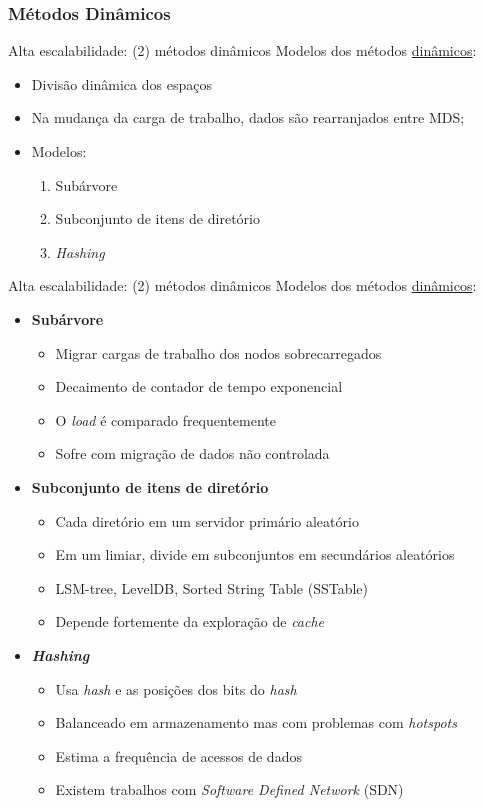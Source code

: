 \documentclass[xcolor=dvipsnames,table]{beamer}
\begin{document}
\subsubsection{Métodos Dinâmicos}
\begin{frame}{Alta escalabilidade: (2) métodos dinâmicos}
	Modelos dos métodos \underline{dinâmicos}:
	\begin{itemize}
		\item Divisão dinâmica dos espaços
		\item Na mudança da carga de trabalho, dados são rearranjados entre MDS;
		\item Modelos:
		\begin{enumerate}
			\item Subárvore
			\item Subconjunto de itens de diretório
			\item \textit{Hashing}
		\end{enumerate}
	\end{itemize}	
\end{frame}

\begin{frame}{Alta escalabilidade: (2) métodos dinâmicos}
	Modelos dos métodos \underline{dinâmicos}:
	\begin{itemize}
		\item \textbf{Subárvore}
		\begin{itemize}
			\item Migrar cargas de trabalho dos nodos sobrecarregados
			\item Decaimento de contador de tempo exponencial
			\item O \textit{load} é comparado frequentemente
			\item Sofre com migração de dados não controlada
		\end{itemize}
		\item \textbf{Subconjunto de itens de diretório}
		\begin{itemize}
			\item Cada diretório em um servidor primário aleatório
			\item Em um limiar, divide em subconjuntos em secundários aleatórios
			\item LSM-tree, LevelDB, Sorted String Table (SSTable)
			\item Depende fortemente da exploração de \textit{cache}
		\end{itemize}
		\item \textbf{\textit{Hashing}}
		\begin{itemize}
			\item Usa \textit{hash} e as posições dos bits do \textit{hash}
			\item Balanceado em armazenamento mas com problemas com \textit{hotspots}
			\item Estima a frequência de acessos de dados
			\item Existem trabalhos com \textit{Software Defined Network} (SDN)
		\end{itemize}
	\end{itemize}
\end{frame}
\end{document}
